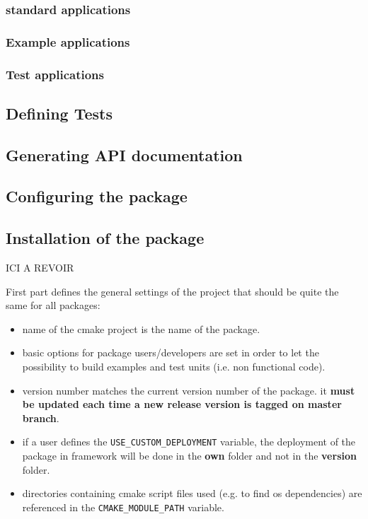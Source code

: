 \documentclass[12pt,a4paper]{article}
\begin{document}
\subsubsection{standard applications}
\label{sec:appCMakeStandard}



\subsubsection{Example applications}
\label{sec:appCMakeExample}


\subsubsection{Test applications}
\label{sec:appCMakeTest}


\subsection{Defining Tests}
\label{sec:testCMake}


\subsection{Generating API documentation}
\label{sec:apiCMake}

\subsection{Configuring the package}
\label{sec:rootCMakeConfig}


\subsection{Installation of the package}
\label{sec:rootCMakeInstall}

ICI A REVOIR

First part defines the general settings of the project that should be quite the same for all packages:
\begin{itemize}
\item name of the cmake project is the name of the package.
\item basic options for package users/developers are set in order to let the possibility to build examples and test units (i.e. non functional code).
\item version number matches the current version number of the package. it \textbf{must be updated each time a new release version is tagged on master branch}.
\item if a user defines the \verb|USE_CUSTOM_DEPLOYMENT| variable, the deployment of the package in framework will be done in the \textbf{own} folder and not in the \textbf{version} folder.
\item directories containing cmake script files used (e.g. to find os dependencies) are referenced in the \verb|CMAKE_MODULE_PATH| variable. 
\end{itemize}
\end{document}
